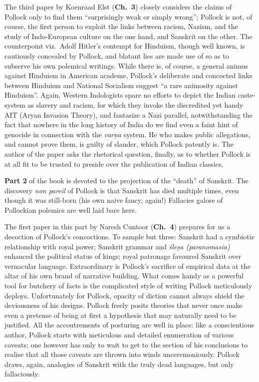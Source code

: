 The third paper by Koenraad Elst ({\bf Ch.~3}) closely considers the claims of Pollock only to find them “surprisingly weak or simply wrong”; Pollock is not, of course, the first person to exploit the links between racism, Nazism, and the study of Indo-European culture on the one hand, and Sanskrit on the other. The counterpoint viz.\ Adolf Hitler’s contempt for Hinduism, though well known, is cautiously concealed by Pollock, and blatant lies are made use of so as to subserve his own polemical writings. While there is, of course, a general animus against Hinduism in American academe, Pollock’s deliberate and concocted links between Hinduism and National Socialism suggest “a rare animosity against Hinduism”.  Again, Western Indologists spare no efforts to depict the Indian caste-system as slavery and racism, for which they invoke the discredited yet handy AIT (Aryan Invasion Theory), and fantasize a Nazi parallel, notwithstanding the fact that nowhere in the long history of India do we find even a faint hint of genocide in connection with the {\sl varṇa} system. He who makes public allegations, and cannot prove them, is guilty of slander, which Pollock patently is. The author of the paper asks the rhetorical question, finally, as to whether Pollock is at all fit to be trusted to preside over the publication of Indian classics.

{\bf Part 2} of the book is devoted to the projection of the “death” of Sanskrit. The discovery {\sl non pareil} of Pollock is that Sanskrit has died multiple times, even though it was still-born (his own naive fancy, again!) Fallacies galore of Pollockian polemics are well laid bare here.

The first paper in this part by Naresh Cuntoor ({\bf Ch.~4}) prepares for us a decoction of Pollock’s concoctions. To sample but three: Sanskrit had a symbiotic relationship with royal power; Sanskrit grammar and {\sl śleṣa (paranomasia)} enhanced the political status of kings; royal patronage favoured Sanskrit over vernacular language. Extraordinary is Pollock’s sacrifice of empirical data at the altar of his own brand of narrative building. What comes handy as a powerful tool for butchery of facts is the complicated style of writing Pollock meticulously deploys. Unfortunately for Pollock, opacity of diction cannot always shield the deviousness of his designs. Pollock freely posits theories that never once make even a pretense of being at first a hypothesis that may naturally need to be justified. All the accoutrements of posturing are well in place: like a conscientious author, Pollock starts with meticulous and detailed enumeration of various caveats; one however has only to wait to get to the section of his conclusions to realise that all those caveats are thrown into winds unceremoniously. Pollock draws, again, analogies of Sanskrit with the truly dead languages, but only fallaciously.


